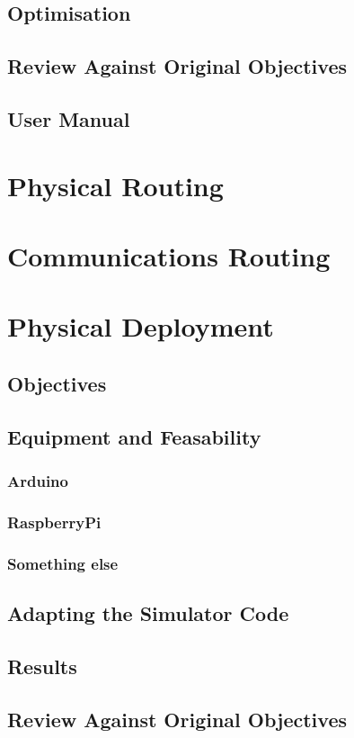 \documentclass[12pt,a4paper,twoside]{report}
\begin{document}
	\section{Optimisation}
	\section{Review Against Original Objectives}
	\section{User Manual}

\chapter{Physical Routing}

\chapter{Communications Routing}

\chapter{Physical Deployment}
	\section{Objectives}
	\section{Equipment and Feasability}
		\subsection{Arduino}
		\subsection{RaspberryPi}
		\subsection{Something else}
	\section{Adapting the Simulator Code}
	\section{Results}
	\section{Review Against Original Objectives}
\end{document}
